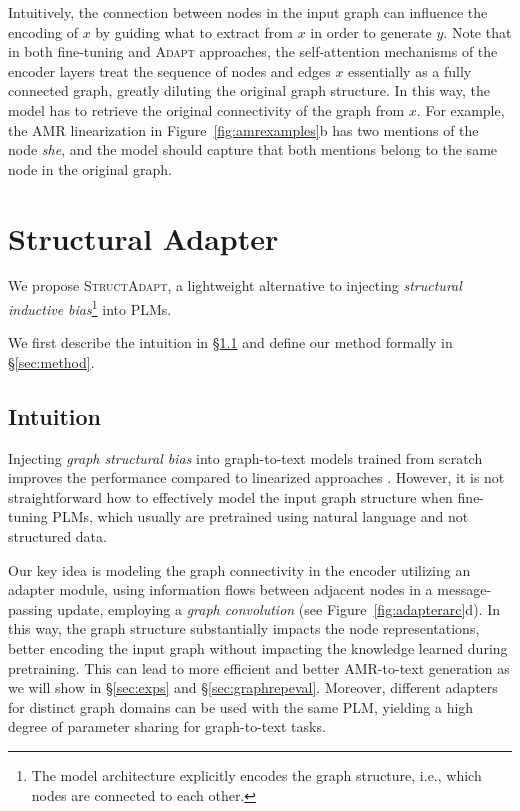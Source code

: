 \documentclass[11pt]{article}
\newcommand{\graphadapter}{{\small\textsc{StructAdapt}}\xspace}
\newcommand{\vanilladapter}{{\small\textsc{Adapt}}\xspace}
\begin{document}
Intuitively, the connection between nodes in the input graph can influence the encoding of $x$ by guiding what to extract from $x$ in order to generate $y$. Note that in both fine-tuning and \vanilladapter approaches, the self-attention mechanisms of the encoder layers treat the sequence of nodes and edges $x$ essentially as a fully connected graph, greatly diluting the original graph structure. In this way, the model has to retrieve the original connectivity of the graph from $x$. For example, the AMR linearization in Figure~\ref{fig:amrexamples}b has two mentions of the node \emph{she}, and the model should capture that both mentions belong to the same node in the original graph. 

\section{Structural Adapter}

We propose \graphadapter, a lightweight alternative to injecting \emph{structural inductive bias}\footnote{The model architecture explicitly encodes the graph structure, i.e., which nodes are connected to each other.} into PLMs.

We first describe the intuition in \S\ref{sec:intuition} and define our method formally in \S\ref{sec:method}.


\subsection{Intuition}
\label{sec:intuition}

Injecting \emph{graph structural bias} into graph-to-text models trained from scratch improves the performance compared to linearized approaches \cite{damonte-cohen-2019-structural, ribeiro-etal-2019-enhancing}. However, it is not straightforward how to effectively model the input graph structure when fine-tuning PLMs, which usually are pretrained using natural language and not structured data. 

Our key idea is modeling the graph connectivity in the encoder utilizing an adapter module, using information flows between adjacent nodes in a message-passing update, employing a \emph{graph convolution} (see Figure~\ref{fig:adapterarc}d). In this way, the graph structure substantially impacts the node representations, better encoding the input graph without impacting the knowledge learned during pretraining. This can lead to more efficient and better AMR-to-text generation as we will show in \S\ref{sec:exps} and \S\ref{sec:graphrepeval}. Moreover, different adapters for distinct graph domains can be used with the same PLM, yielding a high degree of parameter sharing for graph-to-text tasks.
\end{document}
